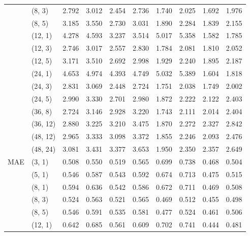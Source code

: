 \begin{longtable}{ll|rr|rr|rr|rr}
      & (8, 3) &     2.792 &      3.012 &   2.454 &    2.736 &    1.740 &     2.025 &  1.692 &   1.976 \\
      & (8, 5) &     3.185 &      3.550 &   2.730 &    3.031 &    1.890 &     2.284 &  1.839 &   2.155 \\
      & (12, 1) &     4.278 &      4.593 &   3.237 &    3.514 &    5.017 &     5.358 &  1.582 &   1.785 \\
      & (12, 3) &     2.746 &      3.017 &   2.557 &    2.830 &    1.784 &     2.081 &  1.810 &   2.052 \\
      & (12, 5) &     3.171 &      3.510 &   2.692 &    2.998 &    1.929 &     2.240 &  1.895 &   2.187 \\
      & (24, 1) &     4.653 &      4.974 &   4.393 &    4.749 &    5.032 &     5.389 &  1.604 &   1.818 \\
      & (24, 3) &     2.831 &      3.069 &   2.448 &    2.724 &    1.751 &     2.038 &  1.749 &   2.002 \\
      & (24, 5) &     2.990 &      3.330 &   2.701 &    2.980 &    1.872 &     2.222 &  2.122 &   2.403 \\
      & (36, 8) &     2.724 &      3.146 &   2.928 &    3.220 &    1.743 &     2.111 &  2.014 &   2.404 \\
      & (36, 12) &     2.880 &      3.225 &   3.210 &    3.475 &    1.870 &     2.272 &  2.327 &   2.842 \\
      & (48, 12) &     2.965 &      3.333 &   3.098 &    3.372 &    1.855 &     2.246 &  2.093 &   2.476 \\
      & (48, 24) &     3.081 &      3.431 &   3.377 &    3.653 &    1.950 &     2.350 &  2.357 &   2.649 \\
\hline \multirow{15}{*}{MAE} & (3, 1) &     0.508 &      0.550 &   0.519 &    0.565 &    0.699 &     0.738 &  0.468 &   0.504 \\
      & (5, 1) &     0.546 &      0.587 &   0.543 &    0.592 &    0.674 &     0.713 &  0.475 &   0.515 \\
      & (8, 1) &     0.594 &      0.636 &   0.542 &    0.586 &    0.672 &     0.711 &  0.469 &   0.508 \\
      & (8, 3) &     0.524 &      0.563 &   0.521 &    0.565 &    0.469 &     0.512 &  0.455 &   0.498 \\
      & (8, 5) &     0.546 &      0.591 &   0.535 &    0.581 &    0.477 &     0.524 &  0.461 &   0.506 \\
      & (12, 1) &     0.642 &      0.685 &   0.561 &    0.609 &    0.702 &     0.741 &  0.444 &   0.481 \\

\end{longtable}
